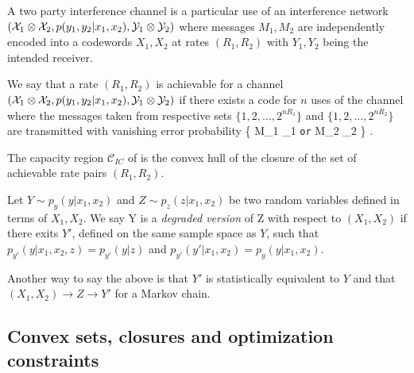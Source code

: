 \documentclass[aps,11pt,twoside,letterpaper]{article}
\newcommand{\ICcap}{  \ensuremath{\mathcal C}_{IC} }
\begin{document}
        \begin{definition}
            A two party interference channel is a particular use of an interference network 
            $({\cal X}_1 \otimes {\cal X}_2, p(y_1,y_2|x_1,x_2), {\cal Y}_1 \otimes {\cal Y}_2)$ 
            where messages $M_1,M_2$ are independently encoded into a codewords $X_1,X_2$ 
            at rates $(R_1,R_2)$ with $Y_1,Y_2$ being the intended receiver.
        \end{definition}

        \begin{definition}   \label{def:achievableICrates}
            We say that a rate $(R_1,R_2)$ is achievable for a channel 
            $({\cal X}_1 \otimes {\cal X}_2, p(y_1,y_2|x_1,x_2), {\cal Y}_1 \otimes {\cal Y}_2)$
            if there exists a code for $n$ uses of the channel where the messages 
            taken from respective sets $\{1,2,\ldots,2^{nR_1} \}$ and
             $\{1,2,\ldots,2^{nR_2} \}$ are transmitted with vanishing error probability
             \be
             	\Pr\left\{ M_1 \neq {}_1 \texttt{or}  M_2 \neq {}_2 \right\} \leq \epsilon.
		\label{eqn:ICerrors}
             \ee
        \end{definition}
        
        \begin{definition}[Capacity]
            The capacity region $\ICcap$ of is the convex hull of the closure of the set of achievable rate pairs $(R_1,R_2)$.
        \end{definition}


        \begin{definition} \label{def:degraded-channel}
            Let $Y \sim p_y(y|x_1,x_2)$ and $Z \sim p_z(z|x_1,x_2)$ be two random variables 
            defined in terms of $X_1,X_2$.
            We say Y is a \emph{degraded version} of Z with respect to $(X_1,X_2)$ if
            there exits $Y'$, defined on the same sample space as $Y$, such that 
            $p_{y'}(y|x_1,x_2,z)=p_{y'}(y|z)$ and $p_{y'}(y'|x_1,x_2) = p_y(y|x_1,x_2)$.
        \end{definition}
        
        Another way to say the above is that $Y'$ is statistically equivalent to $Y$ and
        that $(X_1,X_2) \to Z \to Y' $ for a Markov chain.
        

    \subsection{Convex sets, closures and optimization constraints}
    	
\end{document}
